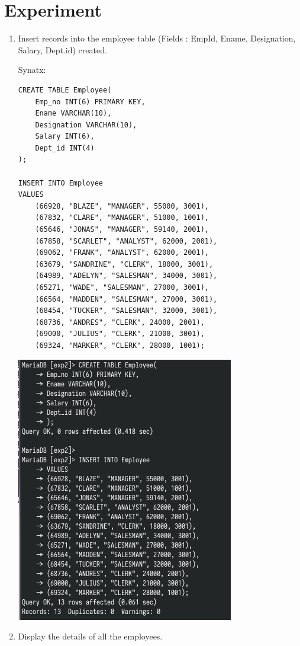 \documentclass[13pt,oneside]{book}
\begin{document}
\section*{Experiment}
	\begin{enumerate}
		\item 
			Insert records into the employee table (Fields : EmpId, Ename,
Designation, Salary, Dept.id) created.
            
             Synatx:
			\begin{verbatim}
CREATE TABLE Employee(
	Emp_no INT(6) PRIMARY KEY,
	Ename VARCHAR(10),
	Designation VARCHAR(10),
	Salary INT(6),
	Dept_id INT(4)
);

INSERT INTO Employee
VALUES
	(66928, "BLAZE", "MANAGER", 55000, 3001),
	(67832, "CLARE", "MANAGER", 51000, 1001),
	(65646, "JONAS", "MANAGER", 59140, 2001),
	(67858, "SCARLET", "ANALYST", 62000, 2001),
	(69062, "FRANK", "ANALYST", 62000, 2001),
	(63679, "SANDRINE", "CLERK", 18000, 3001),
	(64989, "ADELYN", "SALESMAN", 34000, 3001),
	(65271, "WADE", "SALESMAN", 27000, 3001),
	(66564, "MADDEN", "SALESMAN", 27000, 3001),
	(68454, "TUCKER", "SALESMAN", 32000, 3001),
	(68736, "ANDRES", "CLERK", 24000, 2001),
	(69000, "JULIUS", "CLERK", 21000, 3001),
	(69324, "MARKER", "CLERK", 28000, 1001);
			\end{verbatim}
			\includegraphics{img/p2/ss1.png}
		
			\item 
			Display the details of all the employees.
			

\end{enumerate}
\end{document}
